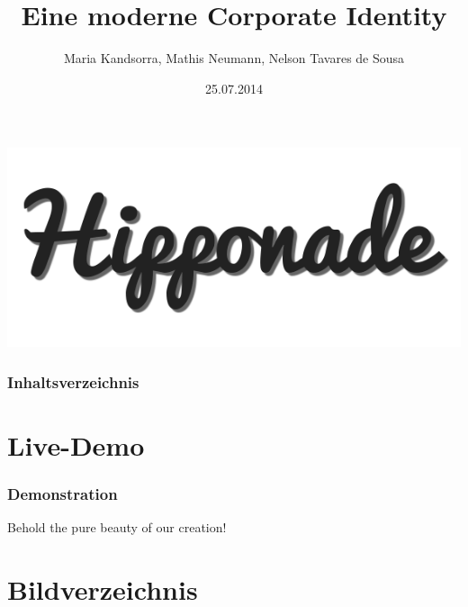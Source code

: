 \documentclass{beamer}
\begin{document}
\title{Eine moderne Corporate Identity}  
\author{Maria Kandsorra, Mathis Neumann, Nelson Tavares de Sousa}
\date{25.07.2014} 

\begin{frame}
	\begin{center}
		\includegraphics[scale=0.5]{bilder/logo.png} 
	\end{center}
	\titlepage
\end{frame} 

\begin{frame}
	\frametitle{Inhaltsverzeichnis}
	\tableofcontents
\end{frame} 









\section{Live-Demo} 
\begin{frame}
	\frametitle{Demonstration} 
	Behold the pure beauty of our creation!
\end{frame}

\section{Bildverzeichnis}
\begin{frame}
	\listoffigures
\end{frame}
\end{document}
